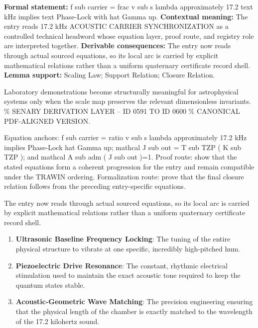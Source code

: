 \begingroup\footnotesize\setlength{\emergencystretch}{3em}\sloppy
\textbf{Formal statement:} f sub carrier = frac v sub s lambda approximately 17.2 text kHz implies text Phase-Lock with hat Gamma up. \textbf{Contextual meaning:} The entry reads 17.2 kHz ACOUSTIC CARRIER SYNCHRONIZATION as a controlled technical headword whose equation layer, proof route, and registry role are interpreted together. \textbf{Derivable consequences:} The entry now reads through actual sourced equations, so its local arc is carried by explicit mathematical relations rather than a uniform quaternary certificate record shell. \textbf{Lemma support:} Scaling Law; Support Relation; Closure Relation.\par
\endgroup

Laboratory demonstrations become structurally meaningful for astrophysical systems only when the scale map preserves the relevant dimensionless invariants. \% SENARY DERIVATION LAYER -- ID 0591 TO ID 0600 \% CANONICAL PDF-ALIGNED VERSION.

Equation anchors: f sub carrier = ratio v sub s lambda approximately 17.2 kHz implies Phase-Lock hat Gamma up; mathcal J sub out = T sub TZP ( K sub TZP ); and mathcal A sub adm ( J sub out )=1. Proof route: show that the stated equations form a coherent progression for the entry and remain compatible under the TRAWIN ordering. Formalization route: prove that the final closure relation follows from the preceding entry-specific equations.

The entry now reads through actual sourced equations, so its local arc is carried by explicit mathematical relations rather than a uniform quaternary certificate record shell.
\endgroup

\begin{enumerate}[leftmargin=1.6em,itemsep=6pt,topsep=4pt]
\item \textbf{Ultrasonic Baseline Frequency Locking}: The tuning of the entire physical structure to vibrate at one specific, incredibly high-pitched hum.
\item \textbf{Piezoelectric Drive Resonance}: The constant, rhythmic electrical stimulation used to maintain the exact acoustic tone required to keep the quantum states stable.
\item \textbf{Acoustic-Geometric Wave Matching}: The precision engineering ensuring that the physical length of the chamber is exactly matched to the wavelength of the 17.2 kilohertz sound.
\end{enumerate}

